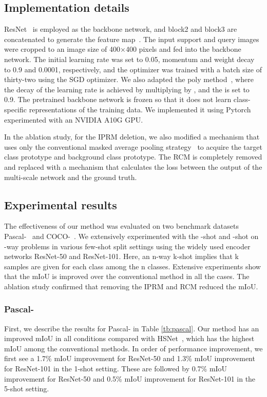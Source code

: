 \documentclass[runningheads]{llncs}
\begin{document}
\subsection{Implementation details}
ResNet~\cite{ResNet} is employed as the backbone network, and block2 and block3 are concatenated to generate the feature map~\cite{CANet}.
The input support and query images were cropped to an image size of 400×400 pixels and fed into the backbone network.
The initial learning rate was set to 0.05, momentum and weight decay to 0.9 and 0.0001, respectively, and the optimizer was trained with a batch size of thirty-two using the SGD optimizer.
We also adapted the poly method~\cite{Deeplab}, where the decay of the learning rate is achieved by multiplying by , and the  is set to 0.9.
The pretrained backbone network is frozen so that it does not learn class-specific representations of the training data.
We implemented it using Pytorch experimented with an NVIDIA A10G GPU.

In the ablation study, for the IPRM deletion, we also modified a mechanism that uses only the conventional masked average pooling strategy~\cite{AMP} to acquire the target class prototype and background class prototype.
The RCM is completely removed and replaced with a mechanism that calculates the loss between the output of the multi-scale network and the ground truth.
\subsection{Experimental results}
The effectiveness of our method was evaluated on two benchmark datasets Pascal-~\cite{Oneshot} and COCO-~\cite{coco}.
We extensively experimented with the -shot and -shot on -way problems in various few-shot split settings using the widely used encoder networks ResNet-50 and ResNet-101.
Here, an n-way k-shot implies that k samples are given for each class among the n classes.
Extensive experiments show that the mIoU is improved over the conventional method in all the cases.
The ablation study confirmed that removing the IPRM and RCM reduced the mIoU.
\subsubsection{Pascal-}
First, we describe the results for Pascal- in Table \ref{tb:pascal}. Our method has
an improved mIoU in all conditions compared with HSNet~\cite{HSNet}, which has the highest mIoU among the conventional methods.
In order of performance improvement, we first see a 1.7\% mIoU improvement for ResNet-50 and 1.3\% mIoU improvement for ResNet-101 in the 1-shot setting. These are followed by 0.7\% mIoU improvement for ResNet-50 and 0.5\% mIoU improvement for ResNet-101 in the 5-shot setting.
\end{document}
